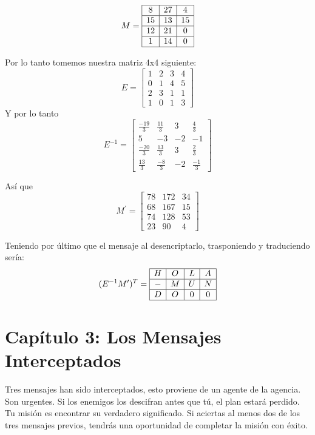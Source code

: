 \documentclass[10pt,a4paper]{article}
\begin{document}
\[
M=\begin{array}{|c|c|c|}
\hline
8 & 27 & 4 \\
\hline
15 & 13 & 15 \\
\hline
12 & 21 &  0 \\
\hline
1 & 14 &  0 \\
\hline
\end{array}
\]

Por lo tanto tomemos nuestra matriz 4x4 siguiente:
\[
E = \begin{bmatrix}
1 & 2 & 3 & 4 \\
0 & 1 & 4 & 5 \\
2 & 3 & 1 & 1 \\
1 & 0 & 1 & 3
\end{bmatrix}
\] 
Y por lo tanto
\[
E^{-1}=\begin{bmatrix}
\frac{-19}{3} & \frac{11}{3} & 3 & \frac{4}{3} \\
5 & -3 & -2 & -1 \\
\frac{-20}{3} & \frac{13}{3} & 3 & \frac{2}{3} \\
\frac{13}{3} & \frac{-8}{3} & -2 & \frac{-1}{3}
\end{bmatrix}
\]

Así que 
\[
M^{\prime}=\begin{bmatrix}
78 & 172 & 34 \\
68 & 167 & 15 \\
74 & 128 & 53 \\
23 & 90 & 4
\end{bmatrix}
\]

Teniendo por último que el mensaje al desencriptarlo, trasponiendo y traduciendo sería:
$$
(E^{-1}M^{\prime})^{T}=\begin{array}{|c|c|c|c|}
\hline
H & O & L & A \\
\hline
- & M & U & N \\
\hline
D & O & 0 & 0 \\
\hline
\end{array}
$$


\section*{Capítulo 3: Los Mensajes Interceptados}
Tres mensajes han sido interceptados, esto proviene de un agente de la agencia. Son urgentes. Si los enemigos los descifran antes que tú, el plan estará perdido. Tu misión es encontrar su verdadero significado. Si aciertas al menos dos de los tres mensajes previos, tendrás una oportunidad de completar la misión con éxito.
\end{document}
